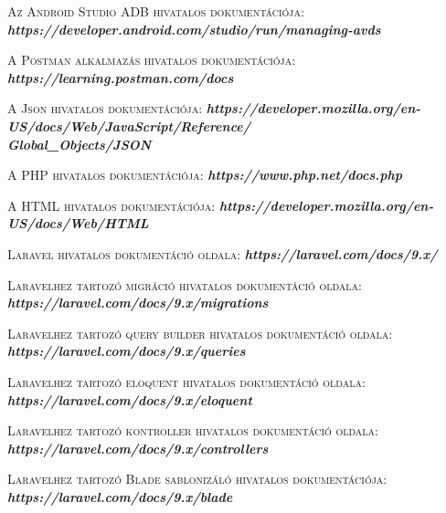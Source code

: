 \documentclass[
]{thesis-ekf}
\theoremstyle{definition}
\theoremstyle{remark}
\begin{document}
\begin{thebibliography}{2}
		\textsc{Az Android Studio ADB hivatalos dokumentációja:}
		\newline
		\emph{\bf{https://developer.android.com/studio/run/managing-avds}}
		
		\textsc{A Postman alkalmazás hivatalos dokumentációja:}
		\newline
		\emph{\bf{https://learning.postman.com/docs}}
		
		\textsc{A Json hivatalos dokumentációja:}
		\newline
		\emph{\bf{https://developer.mozilla.org/en-US/docs/Web/JavaScript/Reference/\\Global\_Objects/JSON}}
		
		\textsc{A PHP hivatalos dokumentációja:}
		\newline
		\emph{\bf{https://www.php.net/docs.php}}
		
		\textsc{A HTML hivatalos dokumentációja:}
		\newline
		\emph{\bf{https://developer.mozilla.org/en-US/docs/Web/HTML}}
		
		\textsc{Laravel hivatalos dokumentáció oldala:}
		\newline
		\emph{\bf{https://laravel.com/docs/9.x/}}
		
		\textsc{Laravelhez tartozó migráció hivatalos dokumentáció oldala:}
		\newline
		\emph{\bf{https://laravel.com/docs/9.x/migrations}}
		
		\textsc{Laravelhez tartozó query builder hivatalos dokumentáció oldala:}
		\newline
		\emph{\bf{https://laravel.com/docs/9.x/queries}}
		
		\textsc{Laravelhez tartozó eloquent hivatalos dokumentáció oldala:}
		\newline
		\emph{\bf{https://laravel.com/docs/9.x/eloquent}}
		
		\textsc{Laravelhez tartozó kontroller hivatalos dokumentáció oldala:}
		\newline
		\emph{\bf{https://laravel.com/docs/9.x/controllers}}
		
		\textsc{Laravelhez tartozó Blade sablonizáló hivatalos dokumentációja:}
		\newline
		\emph{\bf{https://laravel.com/docs/9.x/blade}}
		

\end{thebibliography}
\end{document}
